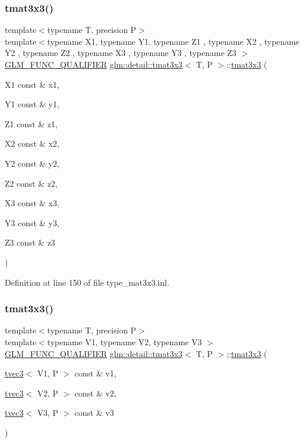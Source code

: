 \subsubsection{\texorpdfstring{tmat3x3()}{tmat3x3()}\hspace{0.1cm}{\footnotesize\ttfamily [20/22]}}
{\footnotesize\ttfamily template$<$typename T, precision P$>$ \\
template$<$typename X1, typename Y1, typename Z1 , typename X2 , typename Y2 , typename Z2 , typename X3 , typename Y3 , typename Z3 $>$ \\
\hyperlink{setup_8hpp_a33fdea6f91c5f834105f7415e2a64407}{G\+L\+M\+\_\+\+F\+U\+N\+C\+\_\+\+Q\+U\+A\+L\+I\+F\+I\+ER} \hyperlink{structglm_1_1detail_1_1tmat3x3}{glm\+::detail\+::tmat3x3}$<$ T, P $>$\+::\hyperlink{structglm_1_1detail_1_1tmat3x3}{tmat3x3} (\begin{DoxyParamCaption}\item[{X1 const \&}]{x1,  }\item[{Y1 const \&}]{y1,  }\item[{Z1 const \&}]{z1,  }\item[{X2 const \&}]{x2,  }\item[{Y2 const \&}]{y2,  }\item[{Z2 const \&}]{z2,  }\item[{X3 const \&}]{x3,  }\item[{Y3 const \&}]{y3,  }\item[{Z3 const \&}]{z3 }\end{DoxyParamCaption})}



Definition at line 150 of file type\+\_\+mat3x3.\+inl.

\mbox{\label{structglm_1_1detail_1_1tmat3x3_a4093d2793f9a8895d7632b8163849670}} 
\subsubsection{\texorpdfstring{tmat3x3()}{tmat3x3()}\hspace{0.1cm}{\footnotesize\ttfamily [21/22]}}
{\footnotesize\ttfamily template$<$typename T, precision P$>$ \\
template$<$typename V1, typename V2, typename V3 $>$ \\
\hyperlink{setup_8hpp_a33fdea6f91c5f834105f7415e2a64407}{G\+L\+M\+\_\+\+F\+U\+N\+C\+\_\+\+Q\+U\+A\+L\+I\+F\+I\+ER} \hyperlink{structglm_1_1detail_1_1tmat3x3}{glm\+::detail\+::tmat3x3}$<$ T, P $>$\+::\hyperlink{structglm_1_1detail_1_1tmat3x3}{tmat3x3} (\begin{DoxyParamCaption}\item[{\hyperlink{structglm_1_1detail_1_1tvec3}{tvec3}$<$ V1, P $>$ const \&}]{v1,  }\item[{\hyperlink{structglm_1_1detail_1_1tvec3}{tvec3}$<$ V2, P $>$ const \&}]{v2,  }\item[{\hyperlink{structglm_1_1detail_1_1tvec3}{tvec3}$<$ V3, P $>$ const \&}]{v3 }\end{DoxyParamCaption})}



